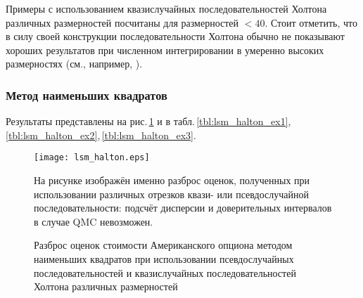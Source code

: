 Примеры с использованием квазислучайных последовательностей Холтона различных размерностей посчитаны для размерностей $< 40$. Стоит отметить, что в силу своей конструкции последовательности Холтона обычно не показывают хороших результатов при численном интегрировании в умеренно высоких размерностях (см., например, \cite{Faure2009}).

\subsubsection{Метод наименьших квадратов} %
\label{ssub:results:qmc_to_classical:halton:lsm}

Результаты представлены на рис.\,\ref{fig:lsm_halton} и в табл.\,\ref{tbl:lsm_halton_ex1},\,\ref{tbl:lsm_halton_ex2},\,\ref{tbl:lsm_halton_ex3}.

\begin{figure}[p]
    \begin{center}
    \texttt{[image: lsm\_halton.eps]}\end{center}
    \caption{Разброс оценок стоимости Американского опциона методом наименьших квадратов при использовании псевдослучайных последовательностей и квазислучайных последовательностей Холтона различных размерностей}
    \label{fig:lsm_halton}
    \linespread{0.8}\footnotesize{На рисунке изображён именно разброс оценок, полученных при использовании различных отрезков квази- или псевдослучайной последовательности: подсчёт дисперсии и доверительных интервалов в случае QMC невозможен.}
\end{figure}

